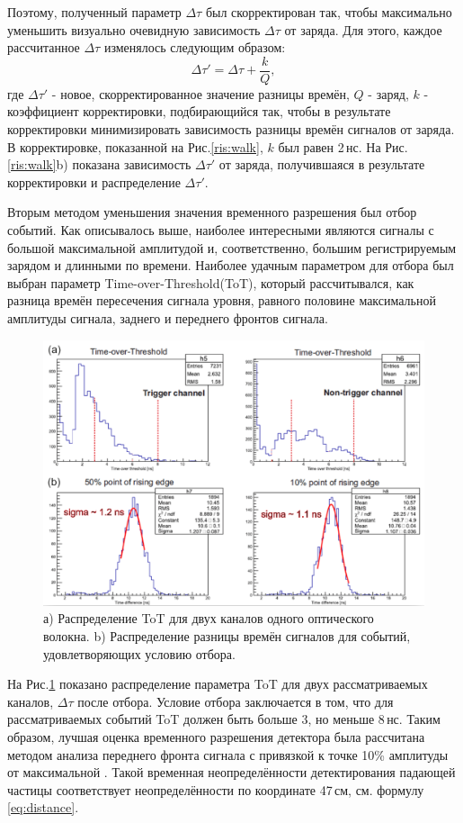 Поэтому, полученный параметр $\Delta\tau$ был скорректирован так, чтобы максимально уменьшить визуально очевидную зависимость $\Delta\tau$ от заряда. Для этого, каждое рассчитанное $\Delta\tau$ изменялось следующим образом:
\begin{equation}
\Delta\tau' = \Delta\tau + \frac{k}{Q},
\end{equation}
где $\Delta\tau'$ - новое, скорректированное значение разницы времён, $Q$ - заряд, $k$ - коэффициент корректировки, подбирающийся так, чтобы в результате корректировки минимизировать зависимость разницы времён сигналов от заряда. В корректировке, показанной на Рис.\ref{ris:walk}, $k$ был равен 2\,нс.
На Рис.\ref{ris:walk}b) показана зависимость $\Delta\tau'$ от заряда, получившаяся в результате корректировки и распределение $\Delta\tau'$. 

Вторым методом уменьшения значения временного разрешения был отбор событий. Как описывалось выше, наиболее интересными являются сигналы с большой максимальной амплитудой и, соответственно, большим регистрируемым зарядом и длинными по времени. Наиболее удачным параметром для отбора был выбран параметр Time-over-Threshold(ToT), который рассчитывался, как разница времён пересечения сигнала уровня, равного половине максимальной амплитуды сигнала, заднего и переднего фронтов сигнала.

\begin{figure}[!h]
	\centering
	\includegraphics[width=0.8\linewidth]{totcorr.png}
	\caption{а) Распределение ToT для двух каналов одного оптического волокна. b) Распределение разницы времён сигналов для событий, удовлетворяющих условию отбора. }\label{ris:totcorr}
\end{figure}

На Рис.\ref{ris:totcorr} показано распределение параметра ToT для двух рассматриваемых каналов, $\Delta\tau$ после отбора. Условие отбора заключается в том, что для рассматриваемых событий ToT должен быть больше 3, но меньше 8\,нс.
Таким образом, лучшая оценка временного разрешения детектора была рассчитана методом анализа переднего фронта сигнала с привязкой к точке 10\% амплитуды от максимальной . Такой временная неопределённости детектирования падающей частицы соответствует неопределённости по координате 47\,см, см. формулу\,\ref{eq:distance}. 

